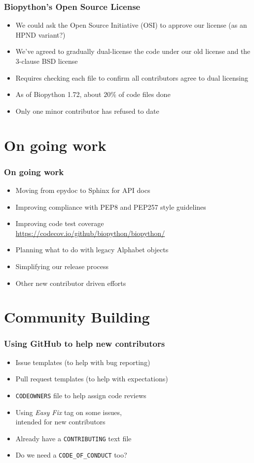 \begin{frame}
\frametitle{Biopython's Open Source License}
\begin{itemize}
\item We could ask the Open Source Initiative (OSI)
    to approve our license (as an HPND variant?)
\item We've agreed to gradually dual-license the code
    under our old license and the 3-clause BSD license
\item Requires checking each file to confirm all
    contributors agree to dual licensing
\item As of Biopython 1.72, about $20\%$ of code files done
\item Only one minor contributor has refused to date
\end{itemize}
\end{frame}

\section{On going work}

\begin{frame}
\frametitle{On going work}
\begin{itemize}
    \item Moving from epydoc to Sphinx for API docs
    \item Improving compliance with PEP8 and PEP257 style guidelines
    \item Improving code test coverage \url{https://codecov.io/github/biopython/biopython/}
    \item Planning what to do with legacy Alphabet objects
    \item Simplifying our release process
    \item Other new contributor driven efforts
\end{itemize}
\end{frame}

\section{Community Building}

\begin{frame}
\frametitle{Using GitHub to help new contributors}
\begin{itemize}
   \item Issue templates (to help with bug reporting)
   \item Pull request templates (to help with expectations)
   \item \texttt{CODEOWNERS} file to help assign code reviews
   \item Using \textit{Easy Fix} tag on some issues, \\ intended for new contributors
   \item Already have a \texttt{CONTRIBUTING} text file
   \item Do we need a \texttt{CODE\_OF\_CONDUCT} too?
\end{itemize}
\end{frame}


